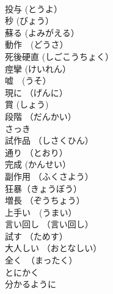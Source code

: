 \documentclass[8pt]{extreport}
\begin{document}
\begin{CJK}{UTF8}{min}
\\	投与 (とうよ）	
\\	秒 (びょう）	
\\	蘇る (よみがえる）	
\\	動作　(どうさ）	
\\	死後硬直 (しごこうちょく）	
\\	痙攣 (けいれん）	
\\	嘘　(うそ）	
\\	現に （げんに）	
\\	賞 (しょう)	
\\	段階 （だんかい）	
\\	さっき	
\\	試作品 （しさくひん）	
\\	通り （とおり）	
\\	完成 (かんせい）	
\\	副作用 （ふくさよう）	
\\	狂暴（きょうぼう）	
\\	増長 （ぞうちょう）	
\\	上手い　(うまい）	
\\	言い回し （言い回し）	
\\	試す （ためす）	
\\	大人しい （おとなしい）	
\\	全く　（まったく）	
\\	とにかく	
\\	分かるように	
\end{CJK}
\end{document}
